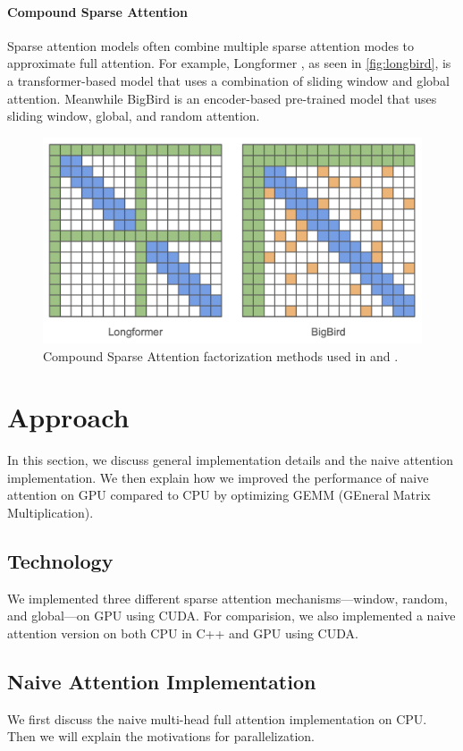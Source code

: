 \documentclass[11pt]{article}
\begin{document}
\paragraph{Compound Sparse Attention}
Sparse attention models often combine multiple sparse attention modes to approximate full attention. For example, Longformer \cite{beltagy2020longformer}, as seen in \autoref{fig:longbird}, is a transformer-based model that uses a combination of sliding window and global attention. Meanwhile BigBird \cite{zaheer2020big} is an encoder-based pre-trained model that uses sliding window, global, and random attention.
\begin{figure}[t]
  \centering
  \includegraphics[width=\linewidth]{figures/longbird.png}
  \caption{Compound Sparse Attention factorization methods used in \citet{beltagy2020longformer} and \citet{zaheer2020big}.}
 \label{fig:longbird}
\end{figure}

\section{Approach}
In this section, we discuss general implementation details and the naive attention implementation. We then explain how we improved the performance of naive attention on GPU compared to CPU by optimizing GEMM (GEneral Matrix Multiplication).

\subsection{Technology}
We implemented three different sparse attention mechanisms---window, random, and global---on GPU using CUDA. For comparision, we also implemented a naive attention version on both CPU in C++ and GPU using CUDA. 

\subsection{Naive Attention Implementation}
We first discuss the naive multi-head full attention implementation on CPU. Then we will explain the motivations for parallelization.
\end{document}
